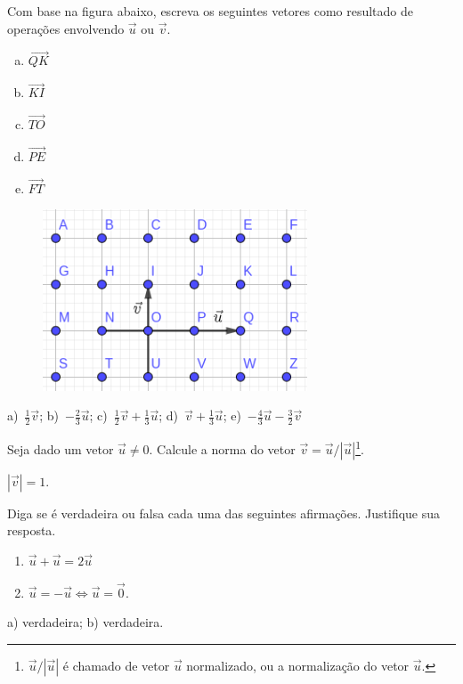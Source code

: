 \begin{exer}
  Com base na figura abaixo, escreva os seguintes vetores como resultado de operações envolvendo $\vec{u}$ ou $\vec{v}$.
  \begin{enumerate}[a)]
  \item $\overrightarrow{QK}$
  \item $\overrightarrow{KI}$
  \item $\overrightarrow{TO}$
  \item $\overrightarrow{PE}$
  \item $\overrightarrow{FT}$
  \end{enumerate}
  \begin{figure}[H]
    \centering
    \includegraphics[width=0.7\textwidth]{./cap_vetor/dados/fig_exer_op_basicas/fig_vec_comb}
  \end{figure}
\end{exer}
\begin{resp}
  a)~$\frac{1}{2}\vec{v}$; b)~$-\frac{2}{3}\vec{u}$; c)~$\frac{1}{2}\vec{v}+\frac{1}{3}\vec{u}$; d)~$\vec{v}+\frac{1}{3}\vec{u}$; e)~$-\frac{4}{3}\vec{u}-\frac{3}{2}\vec{v}$
\end{resp}


\begin{exer}
  Seja dado um vetor $\vec{u}\neq 0$. Calcule a norma do vetor $\vec{v}=\vec{u}/|\vec{u}|$\footnote{$\vec{u}/|\vec{u}|$ é chamado de vetor $\vec{u}$ normalizado, ou a normalização do vetor $\vec{u}$.}.
\end{exer}
\begin{resp}
  $|\vec{v}|=1$.
\end{resp}

\begin{exer}
  Diga se é verdadeira ou falsa cada uma das seguintes afirmações. Justifique sua resposta.
  \begin{enumerate}
  \item $\vec{u}+\vec{u} = 2\vec{u}$
  \item $\vec{u}=-\vec{u} \Leftrightarrow \vec{u} = \vec{0}$.
  \end{enumerate}
\end{exer}
\begin{resp}
  a) verdadeira; b) verdadeira.
\end{resp}

